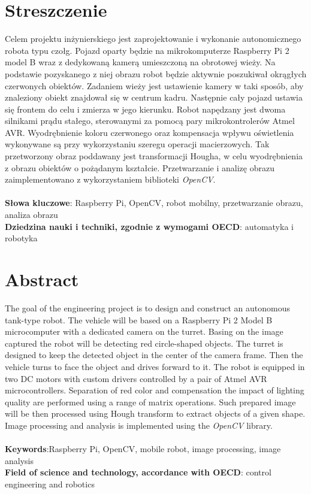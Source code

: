 \chapter*{Streszczenie}
Celem projektu inżynierskiego jest zaprojektowanie i wykonanie autonomicznego robota typu czołg. Pojazd oparty będzie na mikrokomputerze Raspberry Pi 2 model B wraz z dedykowaną kamerą umieszczoną na obrotowej wieży. Na podstawie pozyskanego z niej obrazu robot będzie aktywnie poszukiwał okrągłych czerwonych obiektów. Zadaniem wieży jest ustawienie kamery w taki sposób, aby znaleziony obiekt znajdował się w centrum kadru. Następnie cały pojazd ustawia się frontem do celu i zmierza w jego kierunku. Robot napędzany jest dwoma silnikami prądu stałego, sterowanymi za pomocą pary mikrokontrolerów Atmel AVR. Wyodrębnienie koloru czerwonego oraz kompensacja wpływu oświetlenia wykonywane są przy wykorzystaniu szeregu operacji macierzowych. Tak przetworzony obraz poddawany jest transformacji Hougha, w celu wyodrębnienia z obrazu obiektów o pożądanym kształcie. Przetwarzanie i analizę obrazu zaimplementowano z wykorzystaniem biblioteki \textit{OpenCV}.
\\\\
\noindent
\textbf{Słowa kluczowe}: Raspberry Pi, OpenCV, robot mobilny, przetwarzanie obrazu, analiza obrazu
\\
\noindent
\textbf{Dziedzina nauki i techniki, zgodnie z wymogami OECD}: automatyka i robotyka

\chapter*{Abstract}

The goal of the engineering project is to design and construct an autonomous tank-type robot. The vehicle will be based on a Raspberry Pi 2 Model B microcomputer with a dedicated camera on the turret. Basing on the image captured the robot will be detecting red circle-shaped objects. The turret is designed to keep the detected object in the center of the camera frame. Then the vehicle turns to face the object and drives forward to it. The robot is equipped in two DC motors with custom drivers controlled by a pair of Atmel AVR microcontrollers. Separation of red color and compensation the impact of lighting quality are performed using a range of matrix operations. Such prepared image will be then processed using Hough transform to extract objects of a given shape. Image processing and analysis is implemented using the \textit{OpenCV} library.
\\\\
\noindent
\textbf{Keywords}:Raspberry Pi, OpenCV, mobile robot, image processing, image analysis
\\
\noindent
\textbf{Field of science and technology, accordance with OECD}: control engineering and robotics